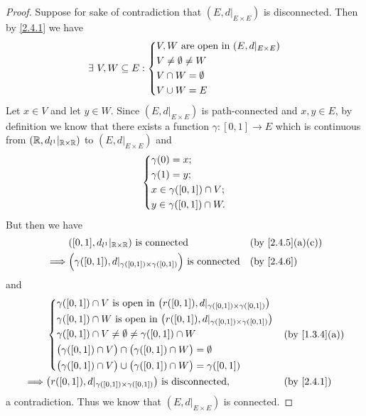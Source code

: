 \begin{proof}
  Suppose for sake of contradiction that \((E, d|_{E \times E})\) is disconnected.
  Then by \cref{2.4.1} we have
  \[
    \exists\ V, W \subseteq E : \begin{dcases}
      V, W \text{ are open in } (E, d|_{E \times E}) \\
      V \neq \emptyset \neq W                        \\
      V \cap W = \emptyset                           \\
      V \cup W = E
    \end{dcases}
  \]
  Let \(x \in V\) and let \(y \in W\).
  Since \((E, d|_{E \times E})\) is path-connected and \(x, y \in E\), by definition we know that there exists a function \(\gamma : [0, 1] \to E\) which is continuous from \((\mathbb{R}, d_{l^1}|_{\mathbb{R} \times \mathbb{R}})\) to \((E, d|_{E \times E})\) and
  \[
    \begin{dcases}
      \gamma(0) = x;               \\
      \gamma(1) = y;               \\
      x \in \gamma([0, 1]) \cap V; \\
      y \in \gamma([0, 1]) \cap W.
    \end{dcases}
  \]
  But then we have
  \begin{align*}
             & ([0, 1], d_{l^1}|_{\R \times \R}) \text{ is connected}                                   &  & \text{(by \cref{2.4.5}(a)(c))} \\
    \implies & \Big(\gamma([0, 1]), d|_{\gamma([0, 1]) \times \gamma([0, 1])}\Big) \text{ is connected} &  & \text{(by \cref{2.4.6})}
  \end{align*}
  and
  \begin{align*}
             & \begin{dcases}
                 \gamma([0, 1]) \cap V \text{ is open in } \big(r([0, 1]), d|_{\gamma([0, 1]) \times \gamma([0, 1])}\big) \\
                 \gamma([0, 1]) \cap W \text{ is open in } \big(r([0, 1]), d|_{\gamma([0, 1]) \times \gamma([0, 1])}\big) \\
                 \gamma([0, 1]) \cap V \neq \emptyset \neq \gamma([0, 1]) \cap W                                          \\
                 \big(\gamma([0, 1]) \cap V\big) \cap \big(\gamma([0, 1]) \cap W\big) = \emptyset                         \\
                 \big(\gamma([0, 1]) \cap V\big) \cup \big(\gamma([0, 1]) \cap W\big) = \gamma([0, 1])
               \end{dcases} &  & \text{(by \cref{1.3.4}(a))}                                  \\
    \implies & \big(r([0, 1]), d|_{\gamma([0, 1]) \times \gamma([0, 1])}\big) \text{ is disconnected},                                     &  & \text{(by \cref{2.4.1})}
  \end{align*}
  a contradiction.
  Thus we know that \((E, d|_{E \times E})\) is connected.
\end{proof}

